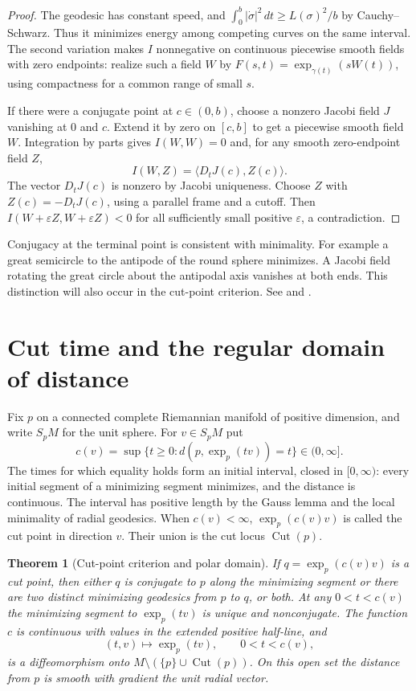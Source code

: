 \documentclass[11pt,oneside,openany]{book}
\theoremstyle{plain}
\newtheorem{theorem}{Theorem}[chapter]
\theoremstyle{definition}
\theoremstyle{remark}
\begin{document}
\begin{proof}
The geodesic has constant speed, and
\(\int_0^b|\dot\sigma|^2\,dt\ge L(\sigma)^2/b\) by
Cauchy--Schwarz. Thus it minimizes energy among competing curves
on the same interval. The second variation makes \(I\)
nonnegative on continuous piecewise smooth fields with zero
endpoints: realize such a field \(W\) by
\(F(s,t)=\exp_{\gamma(t)}(sW(t))\), using compactness for a
common range of small \(s\).

If there were a conjugate point at \(c\in(0,b)\), choose a
nonzero Jacobi field \(J\) vanishing at \(0\) and \(c\). Extend
it by zero on \([c,b]\) to get a piecewise smooth field \(W\).
Integration by parts gives \(I(W,W)=0\) and, for any smooth
zero-endpoint field \(Z\),
\[
 I(W,Z)=\langle D_tJ(c),Z(c)\rangle .
\]
The vector \(D_tJ(c)\) is nonzero by Jacobi uniqueness. Choose
\(Z\) with \(Z(c)=-D_tJ(c)\), using a parallel frame and a
cutoff. Then \(I(W+\varepsilon Z,W+\varepsilon Z)<0\) for
all sufficiently small positive \(\varepsilon\), a
contradiction.
\end{proof}

Conjugacy at the terminal point is consistent with minimality.
For example a great semicircle to the antipode of the round
sphere minimizes. A Jacobi field rotating the great circle about
the antipodal axis vanishes at both ends. This distinction
will also occur in the cut-point criterion. See
\cite[Chapter 10, Theorems 10.22 and 10.28]{LeeRM} and
\cite[Chapter 9, Section 2]{dC}.

\section{Cut time and the regular domain of distance}
\label{p202:G19}

Fix \(p\) on a connected complete Riemannian manifold of positive
dimension, and write \(S_pM\) for the unit sphere. For \(v\in S_pM\)
put
\[
 c(v)=\sup\{t\ge0:d(p,\exp_p(tv))=t\}\in(0,\infty].
\]
The times for which equality holds form an initial interval,
closed in \([0,\infty)\): every initial segment of a minimizing
segment minimizes, and the distance is continuous. The interval
has positive length by the Gauss lemma and the local
minimality of radial geodesics. When \(c(v)<\infty\),
\(\exp_p(c(v)v)\) is called the cut point in direction \(v\).
Their union is the cut locus \(\operatorname{Cut}(p)\).

\begin{theorem}[Cut-point criterion and polar domain]
\label{thm:p202-cut-polar}
If \(q=\exp_p(c(v)v)\) is a cut point, then either \(q\) is
conjugate to \(p\) along the minimizing segment or there are
two distinct minimizing geodesics from \(p\) to \(q\), or both.
At any \(0<t<c(v)\) the minimizing segment to \(\exp_p(tv)\)
is unique and nonconjugate. The function \(c\) is continuous
with values in the extended positive half-line, and
\[
 (t,v)\longmapsto \exp_p(tv),\qquad 0<t<c(v),
\]
is a diffeomorphism onto \(M\setminus(\{p\}\cup
\operatorname{Cut}(p))\). On this open set the distance from
\(p\) is smooth with gradient the unit radial vector.
\end{theorem}
\end{document}
